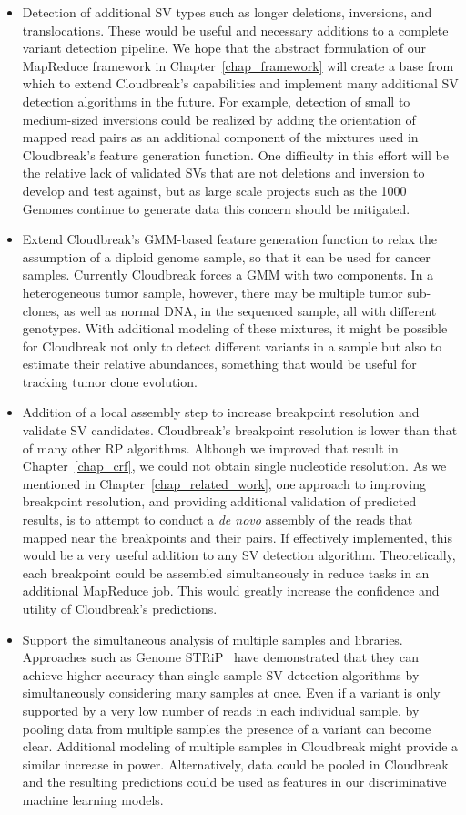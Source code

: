 \begin{itemize}
 \item Detection of additional SV types such as longer deletions, inversions, and translocations. These would be useful and necessary additions to a complete variant detection pipeline. We hope that the abstract formulation of our MapReduce framework in Chapter~\ref{chap_framework} will create a base from which to extend Cloudbreak's capabilities and implement many additional SV detection algorithms in the future. For example, detection of small to medium-sized inversions could be realized by adding the orientation of mapped read pairs as an additional component of the mixtures used in Cloudbreak's feature generation function. One difficulty in this effort will be the relative lack of validated SVs that are not deletions and inversion to develop and test against, but as large scale projects such as the 1000 Genomes continue to generate data this concern should be mitigated.
 \item Extend Cloudbreak's GMM-based feature generation function to relax the assumption of a diploid genome sample, so that it can be used for cancer samples. Currently Cloudbreak forces a GMM with two components. In a heterogeneous tumor sample, however, there may be multiple tumor sub-clones, as well as normal DNA, in the sequenced sample, all with different genotypes. With additional modeling of these mixtures, it might be possible for Cloudbreak not only to detect different variants in a sample but also to estimate their relative abundances, something that would be useful for tracking tumor clone evolution.
 \item Addition of a local assembly step to increase breakpoint resolution and validate SV candidates. Cloudbreak's breakpoint resolution is lower than that of many other RP algorithms. Although we improved that result in Chapter~\ref{chap_crf}, we could not obtain single nucleotide resolution. As we mentioned in Chapter~\ref{chap_related_work}, one approach to improving breakpoint resolution, and providing additional validation of predicted results, is to attempt to conduct a \emph{de novo} assembly of the reads that mapped near the breakpoints and their pairs. If effectively implemented, this would be a very useful addition to any SV detection algorithm. Theoretically, each breakpoint could be assembled simultaneously in reduce tasks in an additional MapReduce job. This would greatly increase the confidence and utility of Cloudbreak's predictions.
 \item Support the simultaneous analysis of multiple samples and libraries. Approaches such as Genome STRiP~\cite{Handsaker:2011ki} have demonstrated that they can achieve higher accuracy than single-sample SV detection algorithms by simultaneously considering many samples at once. Even if a variant is only supported by a very low number of reads in each individual sample, by pooling data from multiple samples the presence of a variant can become clear. Additional modeling of multiple samples in Cloudbreak might provide a similar increase in power. Alternatively, data could be pooled in Cloudbreak and the resulting predictions could be used as features in our discriminative machine learning models.

\end{itemize}
